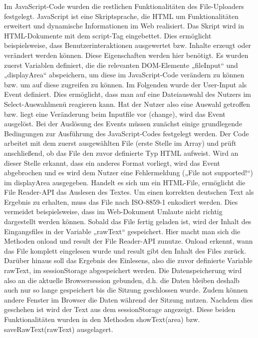 {Im JavaScript-Code wurden die restlichen Funktionalitäten des File-Uploaders festgelegt. JavaScript ist eine Skriptsprache, die HTML um Funktionalitäten erweitert und dynamische Informationen im Web realisiert. Das Skript wird in HTML-Dokumente mit dem script-Tag eingebettet. Dies ermöglicht beispielsweise, dass Benutzerinteraktionen ausgewertet bzw. Inhalte erzeugt oder verändert werden können. Diese Eigenschaften werden hier benötigt. Es wurden zuerst Variablen definiert, die die relevanten DOM-Elemente „fileInput“ und „displayArea“ abspeichern, um diese im JavaScript-Code verändern zu können bzw. um auf diese zugreifen zu können. Im Folgenden wurde der User-Input als Event definiert. Dies ermöglicht, dass man auf eine Dateiauswahl des Nutzers im Select-Auswahlmenü reagieren kann. Hat der Nutzer also eine Auswahl getroffen bzw. liegt eine Veränderung beim Inputfile vor (change), wird das Event ausgelöst. Bei der Auslösung des Events müssen zunächst einige grundlegende Bedingungen zur Ausführung des JavaScript-Codes festgelegt werden. Der Code arbeitet mit dem zuerst ausgewählten File (erste Stelle im Array) und prüft anschließend, ob das File den zuvor definierte Typ HTML aufweist. Wird an dieser Stelle erkannt, dass ein anderes Format vorliegt, wird das Event abgebrochen und es wird dem Nutzer eine Fehlermeldung („File not supported!“) im displayArea ausgegeben. Handelt es sich um ein HTML-File, ermöglicht die File Reader-\ac{API} das Auslesen des Textes. Um einen korrekten deutschen Text als Ergebnis zu erhalten, muss das File nach ISO-8859-1 enkodiert werden. Dies vermeidet beispielsweise, dass im Web-Dokument Umlaute nicht richtig dargestellt werden können. Sobald das File fertig geladen ist, wird der Inhalt des Eingangsfiles in der Variable „rawText“ gespeichert. Hier macht man sich die Methoden onload und result der File Reader-API zunutze. Onload erkennt, wann das File komplett eingelesen wurde und result gibt den Inhalt des Files zurück. Darüber hinaus soll das Ergebnis des Einlesens, also die zuvor definierte Variable rawText, im sessionStorage abgespeichert werden. Die Datenspeicherung wird also an die aktuelle Browsersession gebunden, d.h. die Daten bleiben deshalb auch nur so lange gespeichert bis die Sitzung geschlossen wurde. Zudem können andere Fenster im Browser die Daten während der Sitzung nutzen. Nachdem dies geschehen ist wird der Text aus dem sessionStorage angezeigt. Diese beiden Funktionalitäten wurden in den Methoden showText(area) bzw. saveRawText(rawText) ausgelagert. 

}
